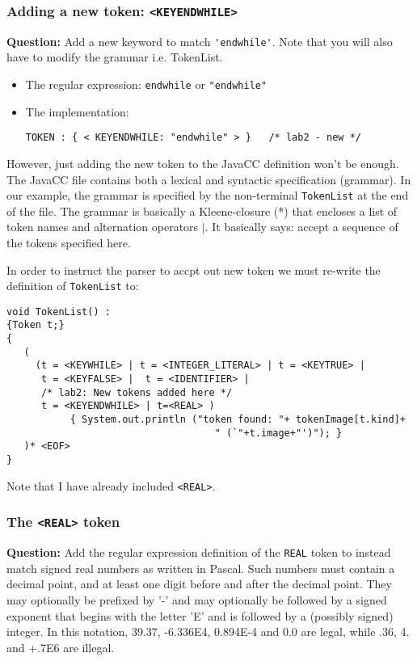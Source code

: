 \documentclass{article}
\begin{document}
\subsubsection*{Adding a new token: {\tt <KEYENDWHILE>}}

\textbf{Question:} Add a new keyword to match \verb+'endwhile'+. Note that you will also have to modify the grammar i.e. TokenList.

\begin{itemize}
\item The regular expression: {\tt endwhile} or \verb+"endwhile"+

\item The implementation:
\begin{verbatim}
TOKEN : { < KEYENDWHILE: "endwhile" > }   /* lab2 - new */
\end{verbatim}
\end{itemize}

However, just adding the new token to the JavaCC definition won't be enough. The JavaCC file contains both a lexical and syntactic specification (grammar). In our example, the grammar is specified by the non-terminal {\tt TokenList} at the end of the file. The grammar is basically a Kleene-closure (*) that encloses a list of token names and alternation operators $|$. It basically says: accept a sequence of the tokens specified here.

In order to instruct the parser to accpt out new token we must re-write the definition of {\tt TokenList} to:

\begin{verbatim}
void TokenList() :
{Token t;}
{
   (
     (t = <KEYWHILE> | t = <INTEGER_LITERAL> | t = <KEYTRUE> | 
      t = <KEYFALSE> |  t = <IDENTIFIER> |
      /* lab2: New tokens added here */
      t = <KEYENDWHILE> | t=<REAL> )
           { System.out.println ("token found: "+ tokenImage[t.kind]+
                                    " (`"+t.image+"')"); }
   )* <EOF>
}
\end{verbatim}

Note that I have already included {\tt <REAL>}.


\subsubsection*{The {\tt <REAL>} token}

\textbf{Question:} Add the regular expression definition of the \verb+REAL+ token  to instead match signed real numbers as written in Pascal. Such numbers must contain a decimal point, and at least one digit before and after the decimal point. They may optionally be prefixed by '-' and may optionally be followed by a signed exponent that begins with the letter 'E' and is followed by a (possibly signed) integer. In this notation, 39.37, -6.336E4, 0.894E-4 and 0.0 are legal, while .36, 4. and +.7E6 are illegal.
\end{document}
